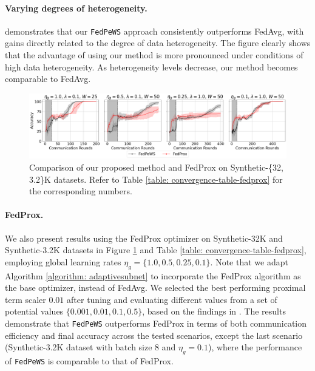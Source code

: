 \documentclass{article}
\begin{document}
\paragraph{Varying degrees of heterogeneity.}  demonstrates that our \texttt{FedPeWS} approach consistently outperforms FedAvg, with gains directly related to the degree of data heterogeneity. The figure clearly shows that the advantage of using our method is more pronounced under conditions of high data heterogeneity. As heterogeneity levels decrease, our method becomes comparable to FedAvg. 

 

\begin{figure}[t]
    \centering
    \includegraphics[trim={0cm 0.2cm 0 0.2cm},clip,width=\linewidth]{images/prox-comb-synth-4-line-v2.pdf} 
    \caption{Comparison of our proposed method and FedProx \citep{li2020federated} on Synthetic-\{32, 3.2\}K datasets. Refer to Table \ref{table: convergence-table-fedprox} for the corresponding numbers.} 
    \label{fig:fedprox-scenario13}
\end{figure}

\paragraph{FedProx.} We also present results using the FedProx optimizer on Synthetic-32K and Synthetic-3.2K datasets in Figure \ref{fig:fedprox-scenario13} and Table \ref{table: convergence-table-fedprox}, employing global learning rates $\eta_g = \{1.0, 0.5, 0.25, 0.1\}$. Note that we adapt Algorithm \ref{algorithm: adaptivesubnet} to incorporate the FedProx algorithm as the base optimizer, instead of FedAvg. 
We selected the best performing proximal term scaler $0.01$ after tuning and evaluating different values from a set of potential values $\{0.001, 0.01, 0.1, 0.5\}$, based on the findings in \citep{li2020federated}. The results demonstrate that \texttt{FedPeWS} outperforms FedProx in terms of both communication efficiency and final accuracy across the tested scenarios, except the last scenario (Synthetic-3.2K dataset with batch size 8 and $\eta_g=0.1$), where the performance of \texttt{FedPeWS} is comparable to that of FedProx. 
\end{document}

